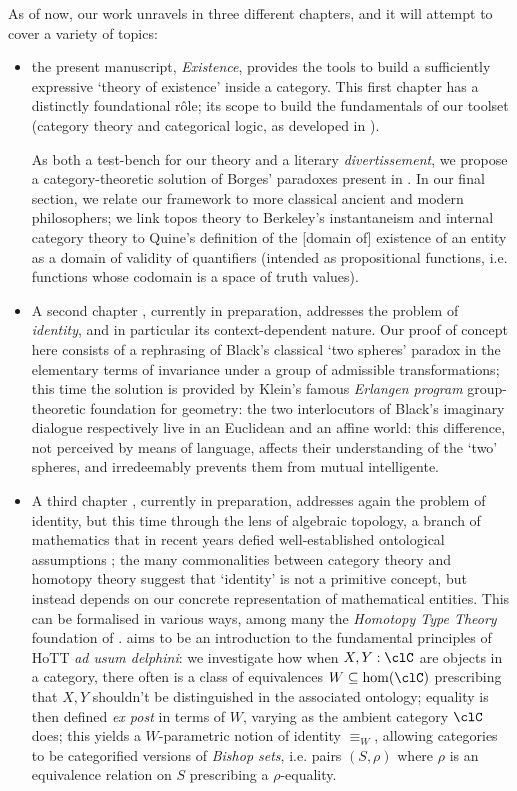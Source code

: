As of now, our work unravels in three different chapters, and it will attempt to cover a variety of topics: 
\begin{itemize}
    \item the present manuscript, \emph{Existence}, provides the tools to build a sufficiently expressive `theory of existence' inside a category. This first chapter has a distinctly foundational r\^ole; its scope to build the fundamentals of our toolset (category theory and categorical logic, as developed in \cite{mac1992sheaves,JohnstonePT,lambek1988introduction}). 
    
    As both a test-bench for our theory and a literary \emph{divertissement}, we propose a category-theoretic solution of Borges' paradoxes present in \cite{Borges1963}. In our final section, we relate our framework to more classical ancient and modern philosophers; we link topos theory to Berkeley's instantaneism and internal category theory to Quine's definition of the [domain of] existence of an entity as a domain of validity of quantifiers (intended as propositional functions, i.e. functions whose codomain is a space of truth values).
    \item A second chapter \cite{black}, currently in preparation, addresses the problem of \emph{identity}, and in particular its context-dependent nature. Our proof of concept here consists of a rephrasing of Black's classical `two spheres' paradox \cite{papear_di_black} in the elementary terms of invariance under a group of admissible transformations; this time the solution is provided by Klein's famous \emph{Erlangen program} group-theoretic foundation for geometry: the two interlocutors of Black's imaginary dialogue respectively live in an Euclidean and an affine world: this difference, not perceived by means of language, affects their understanding of the `two' spheres, and irredeemably prevents them from mutual intelligente.
    \item A third chapter \cite{homot}, currently in preparation, addresses again the problem of identity, but this time through the lens of algebraic topology, a branch of mathematics that in recent years defied well\hyp{}established ontological assumptions ; the many commonalities between category theory and homotopy theory suggest that `identity' is not a primitive concept, but instead depends on our concrete representation of mathematical entities. This can be formalised in various ways, among many the \emph{Homotopy Type Theory} foundation of \cite{hottbook,cwp}. \cite{homot} aims to be an introduction to the fundamental principles of HoTT \emph{ad usum delphini}: we investigate how when $X,Y : \clC$ are objects in a category, there often is a class of equivalences $W \subseteq \hom(\clC)$ prescribing that $X,Y$ shouldn't be distinguished in the associated ontology; equality is then defined \emph{ex post} in terms of $W$, varying as the ambient category $\clC$ does; this yields a $W$-parametric notion of identity $\equiv_W$, allowing categories to be categorified versions of \emph{Bishop sets}, i.e. pairs $(S,\rho)$ where $\rho$ is an equivalence relation on $S$ prescribing a $\rho$-equality.
\end{itemize}
